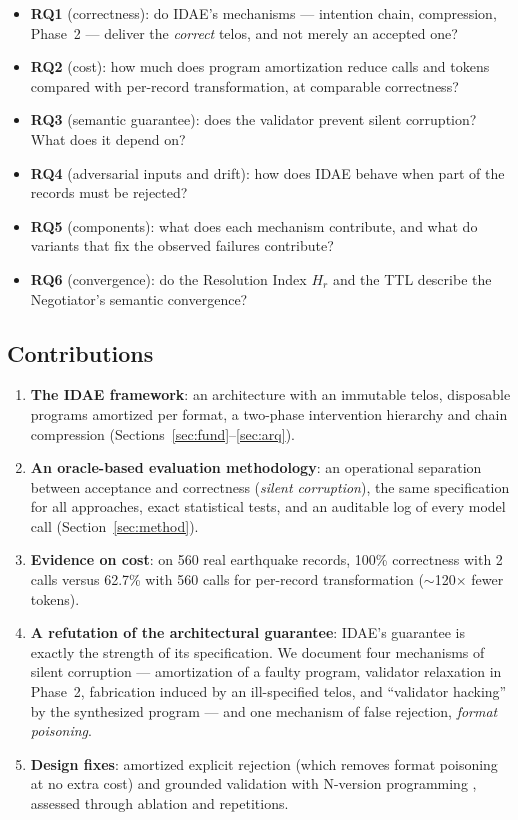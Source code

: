 \documentclass[sigconf,nonacm]{acmart}
\begin{document}
\begin{itemize}
\item \textbf{RQ1} (correctness): do IDAE's mechanisms --- intention chain, compression, Phase~2 --- deliver the \textit{correct} telos, and not merely an accepted one?
\item \textbf{RQ2} (cost): how much does program amortization reduce calls and tokens compared with per-record transformation, at comparable correctness?
\item \textbf{RQ3} (semantic guarantee): does the validator prevent silent corruption? What does it depend on?
\item \textbf{RQ4} (adversarial inputs and drift): how does IDAE behave when part of the records must be rejected?
\item \textbf{RQ5} (components): what does each mechanism contribute, and what do variants that fix the observed failures contribute?
\item \textbf{RQ6} (convergence): do the Resolution Index $H_r$ and the TTL describe the Negotiator's semantic convergence?
\end{itemize}

\subsection{Contributions}

\begin{enumerate}
\item \textbf{The IDAE framework}: an architecture with an immutable telos, disposable programs amortized per format, a two-phase intervention hierarchy and chain compression (Sections~\ref{sec:fund}--\ref{sec:arq}).
\item \textbf{An oracle-based evaluation methodology}: an operational separation between acceptance and correctness (\textit{silent corruption}), the same specification for all approaches, exact statistical tests, and an auditable log of every model call (Section~\ref{sec:method}).
\item \textbf{Evidence on cost}: on 560 real earthquake records, 100\% correctness with 2 calls versus 62.7\% with 560 calls for per-record transformation ($\sim$120$\times$ fewer tokens).
\item \textbf{A refutation of the architectural guarantee}: IDAE's guarantee is exactly the strength of its specification. We document four mechanisms of silent corruption --- amortization of a faulty program, validator relaxation in Phase~2, fabrication induced by an ill-specified telos, and ``validator hacking'' by the synthesized program --- and one mechanism of false rejection, \textit{format poisoning}.
\item \textbf{Design fixes}: amortized explicit rejection (which removes format poisoning at no extra cost) and grounded validation with N-version programming \cite{avizienis1985nversion}, assessed through ablation and repetitions.
\end{enumerate}
\end{document}
